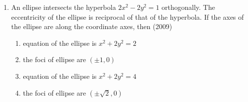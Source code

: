\documentclass[journal,12pt,twocolumn]{IEEEtran}
\theoremstyle{remark}
\begin{document}
\begin{enumerate}
	\item An ellipse intersects the hyperbola $2x^2-2y^2=1$ orthogonally. The eccentricity of the ellipse is reciprocal of that of the hyperbola. If the axes of the ellipse are along the coordinate axes, then \hfill (2009)\\
		\begin{enumerate}
			\item equation of the ellipse is $x^2+2y^2=2$
			\item the foci of ellipse are $(\pm1,0)$
			\item equation of the ellipse is $x^2+2y^2=4$
			\item the foci of ellipse are $(\pm\sqrt{2},0)$
		\end{enumerate}











\end{enumerate}
\end{document}
